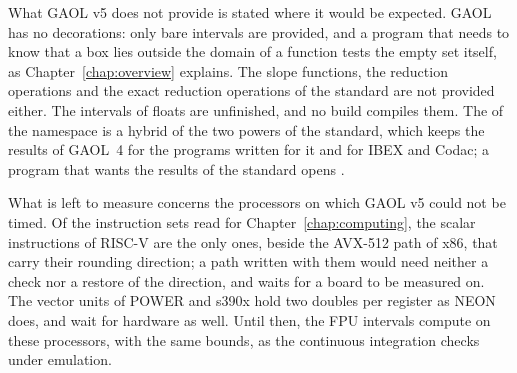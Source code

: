 \medskip
What GAOL v5 does not provide is stated where it would be expected. GAOL has
no decorations: only bare intervals are provided, and a program that needs
to know that a box lies outside the domain of a function tests the empty
set itself, as Chapter~\ref{chap:overview} explains. The slope
functions, the reduction operations and the exact reduction operations of the
standard are not provided either. The intervals of floats are unfinished, and no build
compiles them. The  of the namespace  is a hybrid of the
two powers of the standard, which keeps the results of GAOL~4 for the
programs written for it and for IBEX and Codac; a program that wants the
results of the standard opens .

\medskip
What is left to measure concerns the processors on which GAOL v5 could not be timed.
Of the instruction sets read for Chapter~\ref{chap:computing}, the scalar
instructions of RISC-V are the only ones, beside the AVX-512 path of x86,
that carry their rounding direction; a path written with them would need
neither a check nor a restore of the direction, and waits for a board to be
measured on. The vector units of POWER and s390x hold two doubles per
register as NEON does, and wait for hardware as well. Until then, the FPU
intervals compute on these processors, with the same bounds, as the
continuous integration checks under emulation.
